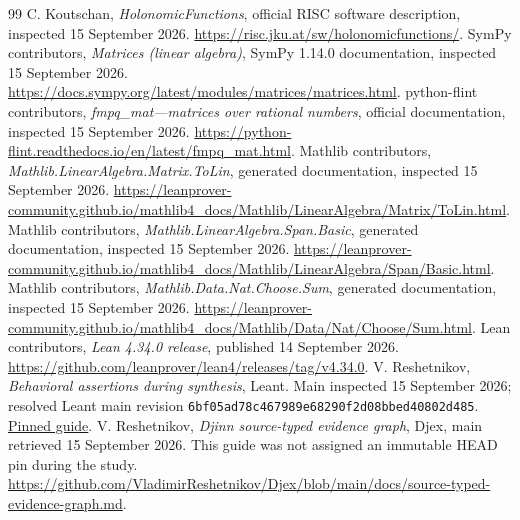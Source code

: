 \begin{thebibliography}{99}
 C. Koutschan, \emph{HolonomicFunctions}, official RISC software
description, inspected 15 September 2026.
\url{https://risc.jku.at/sw/holonomicfunctions/}.
 SymPy contributors, \emph{Matrices (linear algebra)}, SymPy 1.14.0
documentation, inspected 15 September 2026.
\url{https://docs.sympy.org/latest/modules/matrices/matrices.html}.
 python-flint contributors, \emph{fmpq\_mat---matrices over rational
numbers}, official documentation, inspected 15 September 2026.
\url{https://python-flint.readthedocs.io/en/latest/fmpq_mat.html}.
 Mathlib contributors, \emph{Mathlib.LinearAlgebra.Matrix.ToLin},
generated documentation, inspected 15 September 2026.
\url{https://leanprover-community.github.io/mathlib4_docs/Mathlib/LinearAlgebra/Matrix/ToLin.html}.
 Mathlib contributors, \emph{Mathlib.LinearAlgebra.Span.Basic},
generated documentation, inspected 15 September 2026.
\url{https://leanprover-community.github.io/mathlib4_docs/Mathlib/LinearAlgebra/Span/Basic.html}.
 Mathlib contributors, \emph{Mathlib.Data.Nat.Choose.Sum},
generated documentation, inspected 15 September 2026.
\url{https://leanprover-community.github.io/mathlib4_docs/Mathlib/Data/Nat/Choose/Sum.html}.
 Lean contributors, \emph{Lean 4.34.0 release}, published
14 September 2026. \url{https://github.com/leanprover/lean4/releases/tag/v4.34.0}.
 V. Reshetnikov, \emph{Behavioral assertions during synthesis},
Leant. Main inspected 15 September 2026; resolved Leant main revision
\texttt{6bf05ad78c467989e68290f2d08bbed40802d485}.
\href{https://github.com/VladimirReshetnikov/Leant/blob/6bf05ad78c467989e68290f2d08bbed40802d485/docs/behavioral-synthesis.md}{Pinned guide}.
 V. Reshetnikov, \emph{Djinn source-typed evidence graph}, Djex,
main retrieved 15 September 2026. This guide was not assigned an immutable HEAD
pin during the study.
\url{https://github.com/VladimirReshetnikov/Djex/blob/main/docs/source-typed-evidence-graph.md}.
\end{thebibliography}
